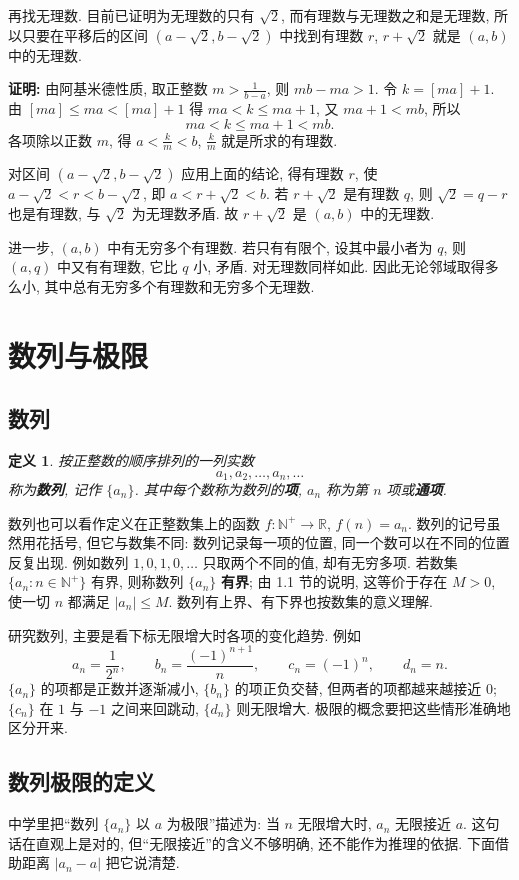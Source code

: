 \documentclass[UTF8,openany]{ctexbook}
\theoremstyle{chinesetextbook}
\newtheorem{definition}{定义}[section]
\newenvironment{cnproof}{\par\indent\textbf{证明:} \ignorespaces}{\par}
\begin{document}
再找无理数. 目前已证明为无理数的只有 $\sqrt2$, 而有理数与无理数之和是无理数, 所以只要在平移后的区间 $(a-\sqrt2,b-\sqrt2)$ 中找到有理数 $r$, $r+\sqrt2$ 就是 $(a,b)$ 中的无理数.
\begin{cnproof}
由阿基米德性质, 取正整数 $\displaystyle m>\frac1{b-a}$, 则 $mb-ma>1$. 令 $k=[ma]+1$. 由 $[ma]\le ma<[ma]+1$ 得 $ma<k\le ma+1$, 又 $ma+1<mb$, 所以
\[
ma<k\le ma+1<mb.
\]
各项除以正数 $m$, 得 $\displaystyle a<\frac km<b$, $\displaystyle\frac km$ 就是所求的有理数.

对区间 $(a-\sqrt2,b-\sqrt2)$ 应用上面的结论, 得有理数 $r$, 使 $a-\sqrt2<r<b-\sqrt2$, 即 $a<r+\sqrt2<b$. 若 $r+\sqrt2$ 是有理数 $q$, 则 $\sqrt2=q-r$ 也是有理数, 与 $\sqrt2$ 为无理数矛盾. 故 $r+\sqrt2$ 是 $(a,b)$ 中的无理数.
\end{cnproof}
进一步, $(a,b)$ 中有无穷多个有理数. 若只有有限个, 设其中最小者为 $q$, 则 $(a,q)$ 中又有有理数, 它比 $q$ 小, 矛盾. 对无理数同样如此. 因此无论邻域取得多么小, 其中总有无穷多个有理数和无穷多个无理数.
\section{数列与极限}
\subsection{数列}
\begin{definition}
按正整数的顺序排列的一列实数
\[
a_1,a_2,\ldots,a_n,\ldots
\]
称为\textbf{数列}, 记作 $\{a_n\}$. 其中每个数称为数列的\textbf{项}, $a_n$ 称为第 $n$ 项或\textbf{通项}.
\end{definition}
数列也可以看作定义在正整数集上的函数 $f:\mathbb N^+\to\mathbb R$, $f(n)=a_n$. 数列的记号虽然用花括号, 但它与数集不同: 数列记录每一项的位置, 同一个数可以在不同的位置反复出现. 例如数列 $1,0,1,0,\ldots$ 只取两个不同的值, 却有无穷多项. 若数集 $\{a_n:n\in\mathbb N^+\}$ 有界, 则称数列 $\{a_n\}$ \textbf{有界}; 由 1.1 节的说明, 这等价于存在 $M>0$, 使一切 $n$ 都满足 $|a_n|\le M$. 数列有上界、有下界也按数集的意义理解.

研究数列, 主要是看下标无限增大时各项的变化趋势. 例如
\[
a_n=\frac1{2^n},\qquad b_n=\frac{(-1)^{n+1}}n,\qquad c_n=(-1)^n,\qquad d_n=n.
\]
$\{a_n\}$ 的项都是正数并逐渐减小, $\{b_n\}$ 的项正负交替, 但两者的项都越来越接近 $0$; $\{c_n\}$ 在 $1$ 与 $-1$ 之间来回跳动, $\{d_n\}$ 则无限增大. 极限的概念要把这些情形准确地区分开来.
\subsection{数列极限的定义}
中学里把“数列 $\{a_n\}$ 以 $a$ 为极限”描述为: 当 $n$ 无限增大时, $a_n$ 无限接近 $a$. 这句话在直观上是对的, 但“无限接近”的含义不够明确, 还不能作为推理的依据. 下面借助距离 $|a_n-a|$ 把它说清楚.
\end{document}
